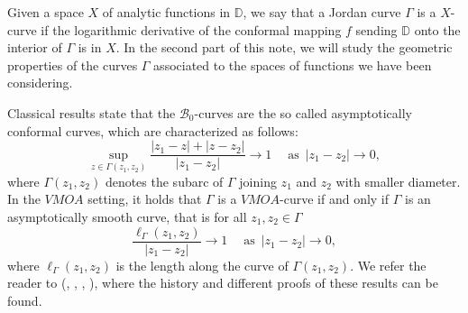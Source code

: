 \documentclass[12pt,a4paper]{article}
\theoremstyle{definition}
\theoremstyle{remark}
\newcommand{\D}{\mathbb{D}}
\numberwithin{komcounter}{section}
\begin{document}
Given a space $X$  of analytic functions in  $\D$, we say that a Jordan curve $\Gamma$ is a $X$-curve if the logarithmic derivative of the conformal mapping $f$ sending $\D$ onto the interior of $\Gamma$ is in $X$. In the second part of this note, we will study the geometric properties of the curves $\Gamma$ associated to the spaces of functions we have been considering.

Classical results \cite{p2} state that the $ \mathcal{B}_0$-curves  are the so called  asymptotically conformal curves, which are characterized as follows:
$$
\sup_{z\in \Gamma(z_1,z_2)}  \frac{|z_1-z|+|z-z_2|}{|z_1-z_2|}\rightarrow 1 \quad \operatorname{as}~ |z_1-z_2|\rightarrow 0,
$$
where ${\Gamma}(z_1,z_2)$ denotes the subarc of  $\Gamma$ joining $z_1$ and $z_2$ with smaller diameter. In the $VMOA$ setting, it holds that $\Gamma$ is a  $VMOA$-curve if and only if $\Gamma$ is an asymptotically smooth curve, that is  for all $z_1,z_2 \in \Gamma$
$$
\frac{\ell_{\Gamma}(z_1,z_2)}{|z_1-z_2|} \rightarrow 1 \quad \operatorname{as} ~ {|z_1-z_2|} \rightarrow 0,
$$ 
where $\ell_\Gamma(z_1,z_2)$ is the length along the curve  of $\Gamma(z_1,z_2)$.
We refer the reader to (\cite{bp}, \cite{d}, \cite{p1}, \cite{p2}), where the history and different proofs of these results can be found.\\
\end{document}
